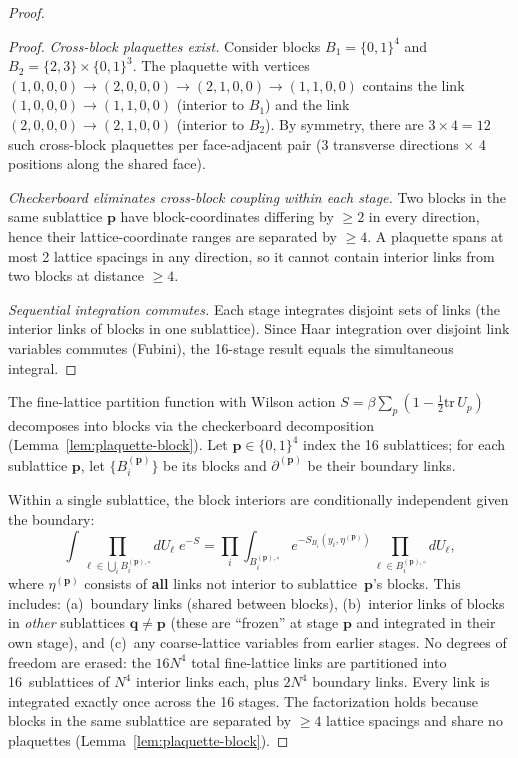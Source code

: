 \documentclass[11pt]{article}
\theoremstyle{definition}
\newcommand{\tr}{\mathrm{tr}}
\begin{document}
\begin{proof}
\begin{proof}
\emph{Cross-block plaquettes exist.}
Consider blocks $B_1=\{0,1\}^4$ and $B_2=\{2,3\}\times\{0,1\}^3$.
The plaquette with vertices
$(1,0,0,0)\to(2,0,0,0)\to(2,1,0,0)\to(1,1,0,0)$
contains the link $(1,0,0,0)\to(1,1,0,0)$ (interior to $B_1$)
and the link $(2,0,0,0)\to(2,1,0,0)$ (interior to $B_2$).
By symmetry, there are $3\times 4=12$ such cross-block plaquettes
per face-adjacent pair (3 transverse directions $\times$
4 positions along the shared face).

\emph{Checkerboard eliminates cross-block coupling within each stage.}
Two blocks in the same sublattice $\mathbf{p}$ have
block-coordinates differing by $\ge 2$ in every direction,
hence their lattice-coordinate ranges are separated by $\ge 4$.
A plaquette spans at most 2 lattice spacings in any direction,
so it cannot contain interior links from two blocks at
distance $\ge 4$.

\emph{Sequential integration commutes.}
Each stage integrates disjoint sets of links
(the interior links of blocks in one sublattice).
Since Haar integration over disjoint link variables commutes
(Fubini), the 16-stage result equals the simultaneous integral.
\end{proof}

The fine-lattice partition function with Wilson action
$S=\beta\sum_p(1-\frac{1}{2}\tr\,U_p)$ decomposes into blocks
via the checkerboard decomposition
(Lemma~\ref{lem:plaquette-block}).
Let $\mathbf{p}\in\{0,1\}^4$ index the 16 sublattices;
for each sublattice $\mathbf{p}$, let
$\{B_i^{(\mathbf{p})}\}$ be its blocks and
$\partial^{(\mathbf{p})}$ be their boundary links.

Within a single sublattice, the block interiors are
conditionally independent given the boundary:
\begin{equation}\label{eq:block-factor}
\int\prod_{\ell\in\bigcup_i B_i^{(\mathbf{p}),\circ}}dU_\ell\;
e^{-S}
=\prod_i\int_{B_i^{(\mathbf{p}),\circ}}
e^{-S_{B_i}(y_i,\eta^{(\mathbf{p})})}
\prod_{\ell\in B_i^{(\mathbf{p}),\circ}}dU_\ell,
\end{equation}
where $\eta^{(\mathbf{p})}$ consists of \textbf{all} links
not interior to sublattice~$\mathbf{p}$'s blocks.
This includes: (a)~boundary links (shared between blocks),
(b)~interior links of blocks in \emph{other} sublattices
$\mathbf{q}\ne\mathbf{p}$ (these are ``frozen'' at stage
$\mathbf{p}$ and integrated in their own stage), and
(c)~any coarse-lattice variables from earlier stages.
No degrees of freedom are erased:
the $16N^4$ total fine-lattice links are partitioned into
16~sublattices of $N^4$ interior links each, plus
$2N^4$ boundary links.  Every link is integrated exactly
once across the 16 stages.
The factorization holds because blocks in the same
sublattice are separated by $\ge 4$ lattice spacings
and share no plaquettes
(Lemma~\ref{lem:plaquette-block}).


\end{proof}
\end{document}
